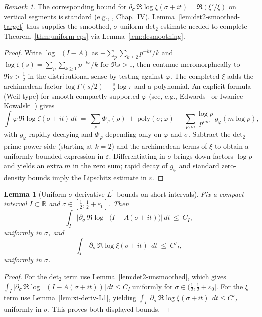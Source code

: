 \documentclass[11pt]{article}
\newtheorem{lemma}[theorem]{Lemma}
\theoremstyle{definition}
\theoremstyle{remark}
\newtheorem{remark}[theorem]{Remark}
\newcommand{\R}{\mathbb{R}}
\DeclareMathOperator{\dettwo}{det_2}
\begin{document}
\begin{remark}
The corresponding bound for \(\partial_\sigma\,\Re\log\xi(\sigma+it)=\Re(\xi'/\xi)\) on vertical segments is standard (e.g., \cite{TitchmarshZeta}, Chap.~IV). Lemma~\ref{lem:det2-smoothed-target} thus supplies the smoothed, \(\sigma\)-uniform det$_2$ estimate needed to complete Theorem~\ref{thm:uniform-eps} via Lemma~\ref{lem:desmoothing}.
\end{remark}
\begin{proof}
Write \(\log\dettwo(I-A)\) as \(-\sum_{p}\sum_{k\ge 2} p^{-ks}/k\) and \(\log\zeta(s)=\sum_{p}\sum_{k\ge 1} p^{-ks}/k\) for \(\Re s>1\), then continue meromorphically to \(\Re s>\tfrac12\) in the distributional sense by testing against \(\varphi\). The completed \(\xi\) adds the archimedean factor \(\log\Gamma(s/2)-\tfrac{s}{2}\log\pi\) and a polynomial. An explicit formula (Weil-type) for smooth compactly supported \(\varphi\) (see, e.g., Edwards~\cite[Ch.~1, §5]{Edwards} or Iwaniec--Kowalski~\cite[Ch.~5]{IwaniecKowalski}) gives
\[
 \int \varphi\,\Re\log\zeta(\sigma+it)\,dt\ =\ \sum_{\rho} \Phi_{\varphi}(\rho)\ +\ \text{poly}(\sigma;\varphi)\ -\sum_{p,m}\frac{\log p}{p^{m\sigma}}\,g_{\varphi}(m\log p),
\]
with \(g_{\varphi}\) rapidly decaying and \(\Phi_{\varphi}\) depending only on \(\varphi\) and \(\sigma\). Subtract the det$_2$ prime-power side (starting at \(k=2\)) and the archimedean terms of \(\xi\) to obtain a uniformly bounded expression in \(\varepsilon\). Differentiating in \(\sigma\) brings down factors \(\log p\) and yields an extra \(m\) in the zero sum; rapid decay of \(g_{\varphi}\) and standard zero-density bounds imply the Lipschitz estimate in \(\varepsilon\).
\end{proof}

\begin{lemma}[Uniform \(\sigma\)-derivative $L^1$ bounds on short intervals]\label{lem:uniform-derivative-L1}
Fix a compact interval \(I\subset\R\) and \(\sigma\in[\tfrac12,\tfrac12+\varepsilon_0]\). Then
\[
 \int_I \Big|\partial_\sigma\,\Re\log\dettwo\big(I-A(\sigma+it)\big)\Big|\,dt\ \le\ C_I,
\]
uniformly in \(\sigma\), and
\[
 \int_I \Big|\partial_\sigma\,\Re\log\xi(\sigma+it)\Big|\,dt\ \le\ C'_I,
\]
uniformly in \(\sigma\).
\end{lemma}
\begin{proof}
For the det$_2$ term use Lemma~\ref{lem:det2-unsmoothed}, which gives
\(\int_I |\partial_\sigma\,\Re\log\dettwo(I-A(\sigma+it))|\,dt\le C_I\) uniformly for \(\sigma\in(\tfrac12,\tfrac12+\varepsilon_0]\).
For the \(\xi\) term use Lemma~\ref{lem:xi-deriv-L1}, yielding \(\int_I |\partial_\sigma\,\Re\log\xi(\sigma+it)|\,dt\le C'_I\) uniformly in \(\sigma\). This proves both displayed bounds.
\end{proof}
\end{document}
